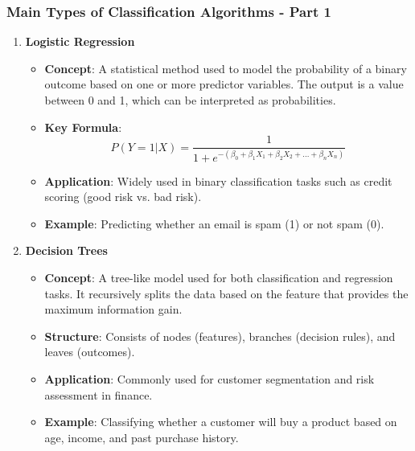 \documentclass[aspectratio=169]{beamer}
\begin{document}
\begin{frame}[fragile]
    \frametitle{Main Types of Classification Algorithms - Part 1}
    
    \begin{enumerate}
        \item \textbf{Logistic Regression}
            \begin{itemize}
                \item \textbf{Concept}: A statistical method used to model the probability of a binary outcome based on one or more predictor variables. The output is a value between 0 and 1, which can be interpreted as probabilities.
                \item \textbf{Key Formula}:
                \begin{equation}
                    P(Y=1|X) = \frac{1}{1 + e^{-(\beta_0 + \beta_1 X_1 + \beta_2 X_2 + ... + \beta_n X_n)}}
                \end{equation}
                \item \textbf{Application}: Widely used in binary classification tasks such as credit scoring (good risk vs. bad risk).
                \item \textbf{Example}: Predicting whether an email is spam (1) or not spam (0).
            \end{itemize}
        \item \textbf{Decision Trees}
            \begin{itemize}
                \item \textbf{Concept}: A tree-like model used for both classification and regression tasks. It recursively splits the data based on the feature that provides the maximum information gain.
                \item \textbf{Structure}: Consists of nodes (features), branches (decision rules), and leaves (outcomes).
                \item \textbf{Application}: Commonly used for customer segmentation and risk assessment in finance.
                \item \textbf{Example}: Classifying whether a customer will buy a product based on age, income, and past purchase history.
            \end{itemize}
    \end{enumerate}
\end{frame}
\end{document}
